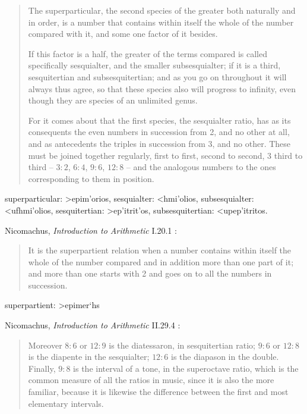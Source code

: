 \documentclass{amsart}
\newcommand{\textgreek}[1]{\begingroup\fontencoding{LGR}\selectfont#1\endgroup}
\theoremstyle{definition}
\begin{document}
\begin{quote}
The superparticular, the second species of the greater both naturally
and in order, is a number that contains within itself the whole of the
number compared with it, and some one factor of it besides. 

If this factor is a half, the greater of the terms compared is called
specifically sesquialter, and the smaller subsesquialter; if it is a
third, sesquitertian and subsesquitertian; and as you go on throughout
it will always thus agree, so that these species also will progress to
infinity, even though they are species of an unlimited genus. 

For it comes about that the first species, the sesquialter ratio, has as
its consequents the even numbers in succession from 2, and no other at
all, and as antecedents the triples in succession from 3, and no other.
These must be joined together regularly, first to first, second to second, 3
third to third -- $3:2$, $6:4$, $9:6$, $12:8$ -- and the analogous numbers to
the ones corresponding to them in position. 
\end{quote}

superparticular: \textgreek{>epim'orios}, 
sesquialter: \textgreek{<hmi'olios},
subsesquialter: \textgreek{<ufhmi'olios},
sesquitertian: \textgreek{>ep'itrit'os},
subsesquitertian: \textgreek{<upep'itritos}.

Nicomachus, {\em Introduction to Arithmetic} I.20.1 \cite[p.~220]{nicomachus}:

\begin{quote}
It is the superpartient relation when a number contains within
itself the whole of the number compared and in addition more than
one part of it; and more than one starts with 2 and goes on to all
the numbers in succession.
\end{quote}

superpartient: \textgreek{>epimer`hs}

Nicomachus, {\em Introduction to Arithmetic} II.29.4 \cite[p.~286]{nicomachus}:

\begin{quote}
Moreover $8 : 6$ or $12 : 9$ is the diatessaron, in sesquitertian ratio; $9 : 6$
or $12 : 8$ is the diapente in the sesquialter; $12 : 6$ is the diapason in the
double. Finally, $9 : 8$ is the interval of a tone, in the superoctave
ratio, which is the common measure of all the ratios in music, since it
is also the more familiar, because it is likewise the difference between
the first and most elementary intervals. 
\end{quote}
\end{document}

